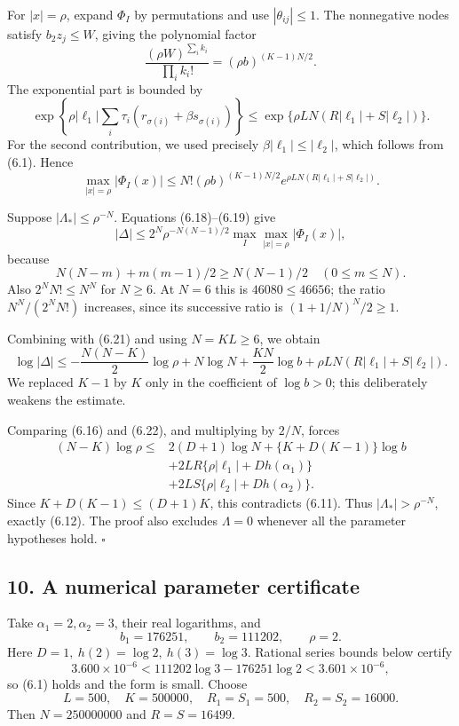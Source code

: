 \documentclass[
  11pt,
  a4paper,
]{article}
\begin{document}
For \(|x|=\rho\), expand \(\Phi_I\) by permutations and use
\(|\theta_{ij}|\le1\). The nonnegative nodes satisfy \(b_2z_j\le W\),
giving the polynomial factor \[
\frac{(\rho W)^{\sum_i k_i}}{\prod_i k_i!}
=(\rho b)^{(K-1)N/2}.
\] The exponential part is bounded by \[
\exp\left\{\rho|\ell_1|\sum_i\tau_i(r_{\sigma(i)}+\beta s_{\sigma(i)})\right\}
\le \exp\{\rho LN(R|\ell_1|+S|\ell_2|)\}. \tag{6.20}
\] For the second contribution, we used precisely
\(\beta|\ell_1|\le|\ell_2|\), which follows from (6.1). Hence \[
\max_{|x|=\rho}|\Phi_I(x)|
\le N!(\rho b)^{(K-1)N/2}
e^{\rho LN(R|\ell_1|+S|\ell_2|)}. \tag{6.21}
\]

Suppose \(|\Lambda_*|\le\rho^{-N}\). Equations (6.18)--(6.19) give \[
|\Delta|\le2^N\rho^{-N(N-1)/2}\max_I\max_{|x|=\rho}|\Phi_I(x)|,
\] because \[
N(N-m)+m(m-1)/2\ge N(N-1)/2\quad(0\le m\le N).
\] Also \(2^NN!\le N^N\) for \(N\ge6\). At \(N=6\) this is
\(46080\le46656\); the ratio \(N^N/(2^NN!)\) increases, since its
successive ratio is \((1+1/N)^N/2\ge1\).

Combining with (6.21) and using \(N=KL\ge6\), we obtain \[
\log|\Delta|\le
-\frac{N(N-K)}2\log\rho+N\log N
+\frac{KN}{2}\log b
+\rho LN(R|\ell_1|+S|\ell_2|). \tag{6.22}
\] We replaced \(K-1\) by \(K\) only in the coefficient of \(\log b>0\);
this deliberately weakens the estimate.

Comparing (6.16) and (6.22), and multiplying by \(2/N\), forces \[
\begin{aligned}
(N-K)\log\rho\le{}&
2(D+1)\log N+\{K+D(K-1)\}\log b\\
&+2LR\{\rho|\ell_1|+Dh(\alpha_1)\}\\
&+2LS\{\rho|\ell_2|+Dh(\alpha_2)\}.
\end{aligned}
\] Since \(K+D(K-1)\le(D+1)K\), this contradicts (6.11). Thus
\(|\Lambda_*|>\rho^{-N}\), exactly (6.12). The proof also excludes
\(\Lambda=0\) whenever all the parameter hypotheses hold. \(\square\)

\subsection{10. A numerical parameter
certificate}\label{a-numerical-parameter-certificate}

Take \(\alpha_1=2,\alpha_2=3\), their real logarithms, and \[
b_1=176251,\qquad b_2=111202,\qquad \rho=2.
\] Here \(D=1,\ h(2)=\log2,\ h(3)=\log3\). Rational series bounds below
certify \[
3.600\times10^{-6}<111202\log3-176251\log2<3.601\times10^{-6},
\] so (6.1) holds and the form is small. Choose \[
L=500,\quad K=500000,\quad
R_1=S_1=500,\quad R_2=S_2=16000.
\] Then \(N=250000000\) and \(R=S=16499\).
\end{document}
